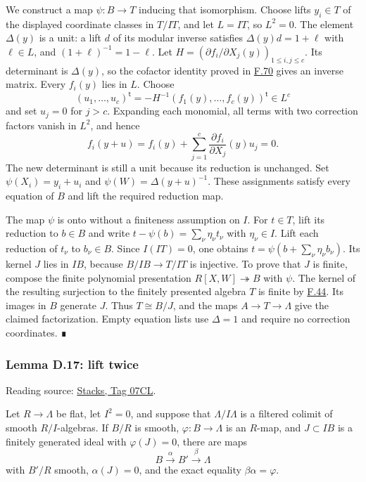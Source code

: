\documentclass[11pt,a4paper,openany]{report}
\begin{document}
We construct a map \(\psi:B\to T\) inducing that isomorphism. Choose lifts \(y_i\in T\) of the displayed coordinate classes in \(T/IT\), and let \(L=IT\), so \(L^2=0\). The element \(\Delta(y)\) is a unit: a lift \(d\) of its modular inverse satisfies \(\Delta(y)d=1+\ell\) with \(\ell\in L\), and \((1+\ell)^{-1}=1-\ell\). Let \(H=(\partial f_i/\partial X_j(y))_{1\leq i,j\leq c}\). Its determinant is \(\Delta(y)\), so the cofactor identity proved in \hyperref[AG-RG-S05-algebra-lemma-matrix-left-inverse]{F.70} gives an inverse matrix. Every \(f_i(y)\) lies in \(L\). Choose \[ (u_1,\ldots,u_c)^{\mathsf t}=-H^{-1}(f_1(y),\ldots,f_c(y))^{\mathsf t}\in L^c\] and set \(u_j=0\) for \(j>c\). Expanding each monomial, all terms with two correction factors vanish in \(L^2\), and hence \[ f_i(y+u)=f_i(y)+\sum_{j=1}^c\frac{\partial f_i}{\partial X_j}(y)u_j=0.\] The new determinant is still a unit because its reduction is unchanged. Set \(\psi(X_i)=y_i+u_i\) and \(\psi(W)=\Delta(y+u)^{-1}\). These assignments satisfy every equation of \(B\) and lift the required reduction map.

The map \(\psi\) is onto without a finiteness assumption on \(I\). For \(t\in T\), lift its reduction to \(b\in B\) and write \(t-\psi(b)=\sum_\nu\eta_\nu t_\nu\) with \(\eta_\nu\in I\). Lift each reduction of \(t_\nu\) to \(b_\nu\in B\). Since \(I(IT)=0\), one obtains \(t=\psi(b+\sum_\nu\eta_\nu b_\nu)\). Its kernel \(J\) lies in \(IB\), because \(B/IB\to T/IT\) is injective. To prove that \(J\) is finite, compose the finite polynomial presentation \(R[X,W]\twoheadrightarrow B\) with \(\psi\). The kernel of the resulting surjection to the finitely presented algebra \(T\) is finite by \hyperref[AG-RG-S05-algebra-lemma-finite-presentation-independent]{F.44}. Its images in \(B\) generate \(J\). Thus \(T\cong B/J\), and the maps \(A\to T\to\Lambda\) give the claimed factorization. Empty equation lists use \(\Delta=1\) and require no correction coordinates. ∎

\label{AG-RG-S05-smoothing-lemma-lift-twice}

\subsubsection{Lemma D.17: lift twice}\label{AG-RG-S05-lemma-d.17-lift-twice}

Reading source: \href{https://stacks.math.columbia.edu/tag/07CL}{Stacks, Tag 07CL}.

Let \(R\to\Lambda\) be flat, let \(I^2=0\), and suppose that \(\Lambda/I\Lambda\) is a filtered colimit of smooth \(R/I\)-algebras. If \(B/R\) is smooth, \(\varphi:B\to\Lambda\) is an \(R\)-map, and \(J\subset IB\) is a finitely generated ideal with \(\varphi(J)=0\), there are maps \[B\xrightarrow{\alpha}B'\xrightarrow{\beta}\Lambda\] with \(B'/R\) smooth, \(\alpha(J)=0\), and the exact equality \(\beta\alpha=\varphi\).
\end{document}
